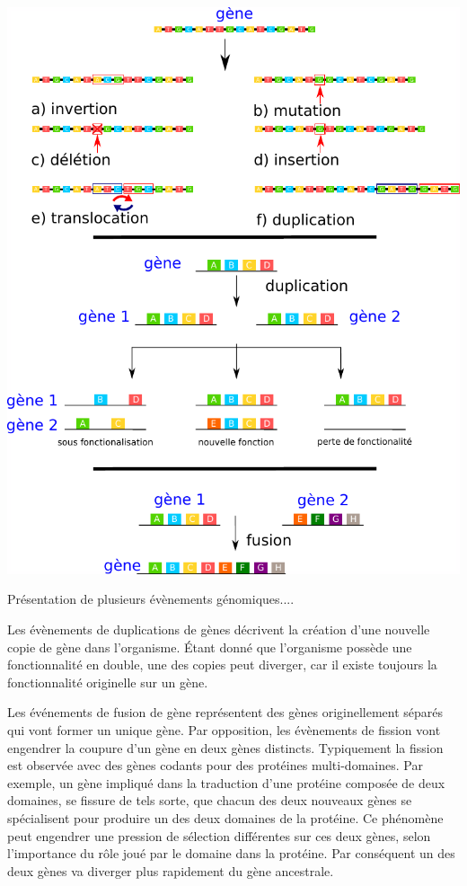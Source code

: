 \begin{refsegment}
    \begin{shadedfigure}[H]
        \centering
        \includegraphics[width=\textwidth]{img/gene_indel.pdf}
        \caption{Présentation de plusieurs évènements génomiques....}
        \label{fig:/evenement_mutation}
    \end{shadedfigure}
    
    
    Les évènements de duplications de gènes décrivent la création d’une nouvelle copie de gène dans l’organisme. Étant donné que l'organisme possède une fonctionnalité en double, une des copies peut diverger, car il existe toujours la fonctionnalité originelle sur un gène. 
    
    Les événements de fusion de gène représentent des gènes originellement séparés qui vont former un unique gène. Par opposition, les évènements de fission vont  engendrer la coupure d’un gène en deux gènes distincts. Typiquement la fission est observée avec des gènes codants pour des protéines multi-domaines. Par exemple, un gène impliqué dans la traduction d'une protéine composée de deux domaines, se fissure de tels sorte, que chacun des deux nouveaux gènes se spécialisent pour produire un des deux domaines de la protéine. Ce phénomène peut engendrer une pression de sélection différentes sur ces deux gènes, selon l’importance du rôle joué par le domaine dans la protéine. Par conséquent un des deux gènes va diverger plus rapidement du gène ancestrale.
    

\end{refsegment}
